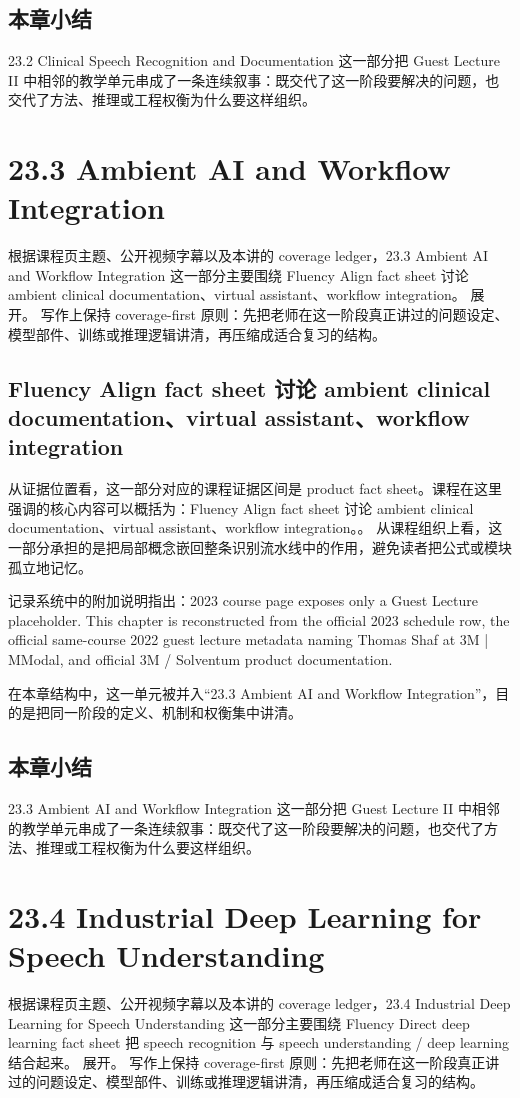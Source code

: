 \documentclass[a4paper]{article}
\begin{document}
\subsection{本章小结}
23.2 Clinical Speech Recognition and Documentation 这一部分把 Guest Lecture II 中相邻的教学单元串成了一条连续叙事：既交代了这一阶段要解决的问题，也交代了方法、推理或工程权衡为什么要这样组织。

\section{23.3 Ambient AI and Workflow Integration}
根据课程页主题、公开视频字幕以及本讲的 coverage ledger，23.3 Ambient AI and Workflow Integration 这一部分主要围绕 Fluency Align fact sheet 讨论 ambient clinical documentation、virtual assistant、workflow integration。 展开。
写作上保持 coverage-first 原则：先把老师在这一阶段真正讲过的问题设定、模型部件、训练或推理逻辑讲清，再压缩成适合复习的结构。

\subsection{Fluency Align fact sheet 讨论 ambient clinical documentation、virtual assistant、workflow integration}
从证据位置看，这一部分对应的课程证据区间是 product fact sheet。课程在这里强调的核心内容可以概括为：Fluency Align fact sheet 讨论 ambient clinical documentation、virtual assistant、workflow integration。。
从课程组织上看，这一部分承担的是把局部概念嵌回整条识别流水线中的作用，避免读者把公式或模块孤立地记忆。

记录系统中的附加说明指出：2023 course page exposes only a Guest Lecture placeholder. This chapter is reconstructed from the official 2023 schedule row, the official same-course 2022 guest lecture metadata naming Thomas Shaf at 3M | MModal, and official 3M / Solventum product documentation.

在本章结构中，这一单元被并入“23.3 Ambient AI and Workflow Integration”，目的是把同一阶段的定义、机制和权衡集中讲清。

\subsection{本章小结}
23.3 Ambient AI and Workflow Integration 这一部分把 Guest Lecture II 中相邻的教学单元串成了一条连续叙事：既交代了这一阶段要解决的问题，也交代了方法、推理或工程权衡为什么要这样组织。

\section{23.4 Industrial Deep Learning for Speech Understanding}
根据课程页主题、公开视频字幕以及本讲的 coverage ledger，23.4 Industrial Deep Learning for Speech Understanding 这一部分主要围绕 Fluency Direct deep learning fact sheet 把 speech recognition 与 speech understanding / deep learning 结合起来。 展开。
写作上保持 coverage-first 原则：先把老师在这一阶段真正讲过的问题设定、模型部件、训练或推理逻辑讲清，再压缩成适合复习的结构。
\end{document}
